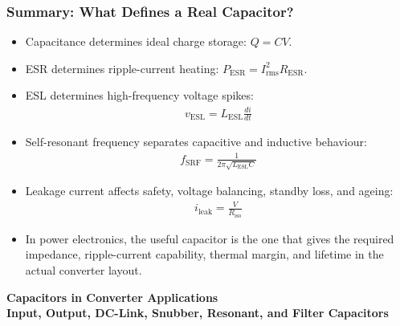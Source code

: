 \begin{frame}
\frametitle{Summary: What Defines a Real Capacitor?}
\begin{itemize}
    \item Capacitance determines ideal charge storage: $Q=CV$.
    \item ESR determines ripple-current heating: $P_{\mathrm{ESR}}=I_{\mathrm{rms}}^2R_{\mathrm{ESR}}$.
    \item ESL determines high-frequency voltage spikes:
    \begin{align}
        v_{\mathrm{ESL}}=L_{\mathrm{ESL}}\frac{di}{dt}
    \end{align}
    \item Self-resonant frequency separates capacitive and inductive behaviour:
    \begin{align}
        f_{\mathrm{SRF}}=\frac{1}{2\pi\sqrt{L_{\mathrm{ESL}}C}}
    \end{align}
    \item Leakage current affects safety, voltage balancing, standby loss, and ageing:
    \begin{align}
        i_{\mathrm{leak}}=\frac{V}{R_{\mathrm{iso}}}
    \end{align}
    \item In power electronics, the useful capacitor is the one that gives the required impedance, ripple-current capability, thermal margin, and lifetime in the actual converter layout.
\end{itemize}

\end{frame}

\begin{frame}
\begin{center}
  \textbf{\Huge{Capacitors in Converter Applications}}\\[0.4cm]
  \textbf{\Large{Input, Output, DC-Link, Snubber, Resonant, and Filter Capacitors}}
\end{center}
\end{frame}


